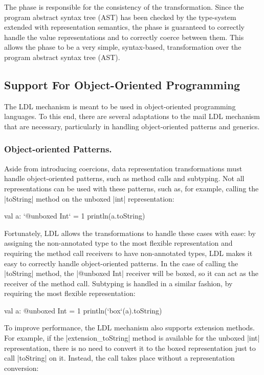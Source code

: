 The \commit{} phase is responsible for the consistency of the transformation. Since the program abstract syntax tree (AST) has been checked by the type-system extended with representation semantics, the \commit{} phase is guaranteed to correctly handle the value representations and to correctly coerce between them. This allows the \commit{} phase to be a very simple, syntax-based, transformation over the program abstract syntax tree (AST).

\subsection{Support For Object-Oriented Programming}

The LDL mechanism is meant to be used in object-oriented programming languages. To this end, there are several adaptations to the mail LDL mechanism that are necessary, particularly in handling object-oriented patterns and generics.

\subsubsection{Object-oriented Patterns.} Aside from introducing coercions, data representation transformations must handle object-oriented patterns, such as method calls and subtyping. Not all representations can be used with these patterns, such as, for example, calling the |toString| method on the unboxed |int| representation:

\begin{lstlisting-nobreak}
val a: `@unboxed Int` = 1
println(a.toString)
\end{lstlisting-nobreak}

Fortunately, LDL allows the transformations to handle these cases with ease: by assigning the non-annotated type to the most flexible representation and requiring the method call receivers to have non-annotated types, LDL makes it easy to correctly handle object-oriented patterns. In the case of calling the |toString| method, the |@unboxed Int| receiver will be boxed, so it can act as the receiver of the method call. Subtyping is handled in a similar fashion, by requiring the most flexible representation:

\begin{lstlisting-nobreak}
val a: @unboxed Int = 1
println(`box`(a).toString)
\end{lstlisting-nobreak}

To improve performance, the LDL mechanism also supports extension methods. For example, if the |extension_toString| method is available for the unboxed |int| representation, there is no need to convert it to the boxed representation just to call |toString| on it. Instead, the call takes place without a representation conversion:

